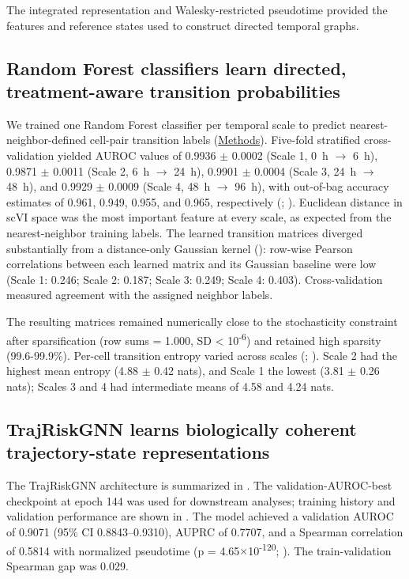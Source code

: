 The integrated representation and Walesky-restricted pseudotime provided the features and reference states used to construct directed temporal graphs.


\subsection*{Random Forest classifiers learn directed, treatment-aware transition probabilities}

We trained one Random Forest classifier per temporal scale to predict nearest-neighbor-defined cell-pair transition labels (\hyperref[sec:methods]{Methods}). Five-fold stratified cross-validation yielded AUROC values of 0.9936 \ensuremath{\pm} 0.0002 (Scale 1, 0~h \ensuremath{\rightarrow} 6~h), 0.9871 \ensuremath{\pm} 0.0011 (Scale 2, 6~h \ensuremath{\rightarrow} 24~h), 0.9901 \ensuremath{\pm} 0.0004 (Scale 3, 24~h \ensuremath{\rightarrow} 48~h), and 0.9929 \ensuremath{\pm} 0.0009 (Scale 4, 48~h \ensuremath{\rightarrow} 96~h), with out-of-bag accuracy estimates of 0.961, 0.949, 0.955, and 0.965, respectively (; ). Euclidean distance in scVI space was the most important feature at every scale, as expected from the nearest-neighbor training labels. The learned transition matrices diverged substantially from a distance-only Gaussian kernel (): row-wise Pearson correlations between each learned matrix and its Gaussian baseline were low (Scale 1: 0.246; Scale 2: 0.187; Scale 3: 0.249; Scale 4: 0.403). Cross-validation measured agreement with the assigned neighbor labels.

The resulting matrices remained numerically close to the stochasticity constraint after sparsification (row sums = 1.000, SD < 10\textsuperscript{-6}) and retained high sparsity (99.6-99.9\%). Per-cell transition entropy varied across scales (; ). Scale 2 had the highest mean entropy (4.88 \ensuremath{\pm} 0.42 nats), and Scale 1 the lowest (3.81 \ensuremath{\pm} 0.26 nats); Scales 3 and 4 had intermediate means of 4.58 and 4.24 nats.


\subsection*{TrajRiskGNN learns biologically coherent trajectory-state representations}

The TrajRiskGNN architecture is summarized in . The validation-AUROC-best checkpoint at epoch 144 was used for downstream analyses; training history and validation performance are shown in . The model achieved a validation AUROC of 0.9071 (95\% CI 0.8843--0.9310), AUPRC of 0.7707, and a Spearman correlation of 0.5814 with normalized pseudotime (p = 4.65\ensuremath{\times}10\textsuperscript{-120}; ). The train-validation Spearman gap was 0.029.


